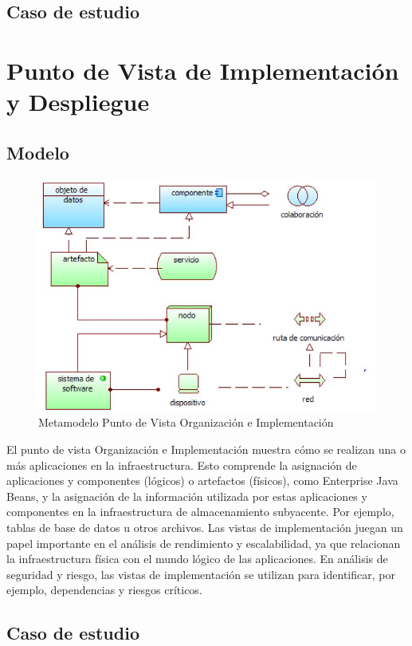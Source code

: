 \subsection{Caso de estudio}

\newpage

\section{Punto de Vista de Implementación y Despliegue}

\subsection{Modelo}

\begin{figure}[th!]
	\centering
	\includegraphics[width=0.5\linewidth]{arquitectura/imagenes/modeloOrganizacionImplementacion}
	\caption{Metamodelo Punto de Vista Organización e Implementación}
	\label{metamodeloOrganizacionImplementacion}
\end{figure}
El punto de vista Organización e Implementación muestra cómo se realizan una o más aplicaciones en la infraestructura. Esto comprende la asignación de aplicaciones y componentes (lógicos) o artefactos (físicos), como Enterprise Java Beans, y la asignación de la información utilizada por estas aplicaciones y componentes en la infraestructura de almacenamiento subyacente. Por ejemplo, tablas de base de datos u otros archivos. Las vistas de implementación juegan un papel importante en el análisis de rendimiento y escalabilidad, ya que relacionan la infraestructura física con el mundo lógico de las aplicaciones. En análisis de seguridad y riesgo, las vistas de implementación se utilizan para identificar, por ejemplo, dependencias y riesgos críticos.

\subsection{Caso de estudio}

\newpage

